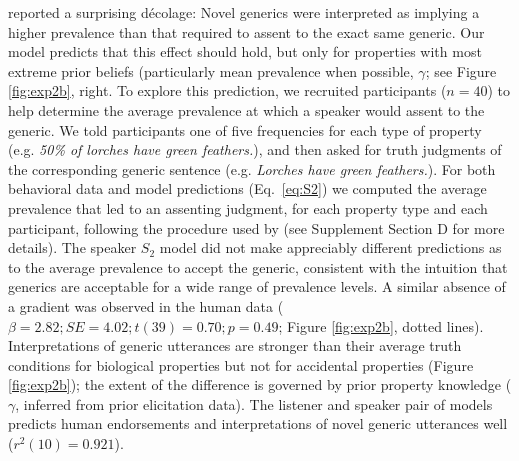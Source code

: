\documentclass[10pt,letterpaper]{article}
\newcommand{\ndg}[1]{\textcolor{Green}{[ndg: #1]}}
\begin{document}
 reported a surprising d\'{e}colage: Novel generics were interpreted as implying a higher prevalence than that required to assent to the exact same generic.
Our model predicts that this effect should hold, but only for properties with most extreme prior beliefs (particularly mean prevalence when possible, $\gamma$; see Figure \ref{fig:exp2b}, right.
To explore this prediction, we recruited participants ($n=40$) to help determine the average prevalence at which a speaker would assent to the generic. 
We told participants one of five frequencies for each type of property (e.g. \emph{50\% of lorches have green feathers.}), and then asked for truth judgments of the corresponding generic sentence (e.g. \emph{Lorches have green feathers.}). 
For both behavioral data and model predictions (Eq.~\ref{eq:S2})  we computed the average prevalence that led to an assenting judgment, for each property type and each participant, following the procedure used by  (see Supplement Section D for more details).
%
%
The speaker $S_2$ model did not make appreciably different predictions as to the average prevalence to accept the generic, consistent with the intuition that generics are acceptable for a wide range of prevalence levels. 
A similar absence of a gradient was observed in the human data ($\beta = 2.82; SE = 4.02; t(39) = 0.70; p = 0.49$; Figure \ref{fig:exp2b}, dotted lines). 
Interpretations of generic utterances are stronger than their average truth conditions for biological properties but not for accidental properties (Figure \ref{fig:exp2b}); the extent of the difference is governed by prior property knowledge ($\gamma$, inferred from prior elicitation data).
The listener and speaker pair of models predicts human endorsements and interpretations of novel generic utterances well ($r^2(10) = 0.921$). 
\end{document}
